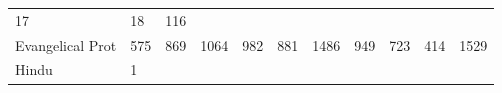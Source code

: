 \documentclass[]{article}
\begin{document}
\begin{longtable}[]{@{}lllllllllll@{}}
\begin{minipage}[t]{0.06\columnwidth}
17\strut
\end{minipage} & \begin{minipage}[t]{0.04\columnwidth}\raggedright\strut
18\strut
\end{minipage} & \begin{minipage}[t]{0.11\columnwidth}\raggedright\strut
116\strut
\end{minipage}\tabularnewline
\begin{minipage}[t]{0.14\columnwidth}\raggedright\strut
Evangelical Prot\strut
\end{minipage} & \begin{minipage}[t]{0.04\columnwidth}\raggedright\strut
575\strut
\end{minipage} & \begin{minipage}[t]{0.05\columnwidth}\raggedright\strut
869\strut
\end{minipage} & \begin{minipage}[t]{0.05\columnwidth}\raggedright\strut
1064\strut
\end{minipage} & \begin{minipage}[t]{0.05\columnwidth}\raggedright\strut
982\strut
\end{minipage} & \begin{minipage}[t]{0.05\columnwidth}\raggedright\strut
881\strut
\end{minipage} & \begin{minipage}[t]{0.05\columnwidth}\raggedright\strut
1486\strut
\end{minipage} & \begin{minipage}[t]{0.06\columnwidth}\raggedright\strut
949\strut
\end{minipage} & \begin{minipage}[t]{0.06\columnwidth}\raggedright\strut
723\strut
\end{minipage} & \begin{minipage}[t]{0.04\columnwidth}\raggedright\strut
414\strut
\end{minipage} & \begin{minipage}[t]{0.11\columnwidth}\raggedright\strut
1529\strut
\end{minipage}\tabularnewline
\begin{minipage}[t]{0.14\columnwidth}\raggedright\strut
Hindu\strut
\end{minipage} & \begin{minipage}[t]{0.04\columnwidth}\raggedright\strut
1\strut
\end{minipage} & \begin{minipage}[t]{0.05\columnwidth}\raggedright\strut

\end{minipage}
\end{longtable}
\end{document}
